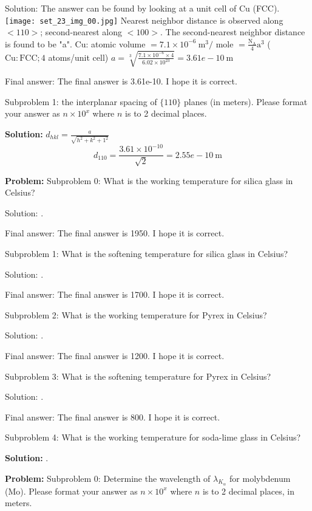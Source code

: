 \documentclass[10pt]{article}
\begin{document}
Solution: The answer can be found by looking at a unit cell of $\mathrm{Cu}$ (FCC).
\texttt{[image: set\_23\_img\_00.jpg]}
\nonessentialimage
Nearest neighbor distance is observed along $<110>$; second-nearest along $<100>$. The second-nearest neighbor distance is found to be "a".
Cu: atomic volume $=7.1 \times 10^{-6} \mathrm{~m}^{3} /$ mole $=\frac{\mathrm{N}_{\mathrm{A}}}{4} \mathrm{a}^{3}$ ( $\mathrm{Cu}: \mathrm{FCC} ; 4$ atoms/unit cell) $a=\sqrt[3]{\frac{7.1 \times 10^{-6} \times 4}{6.02 \times 10^{23}}}= \boxed{3.61e-10} \mathrm{~m}$

Final answer: The final answer is 3.61e-10. I hope it is correct.

Subproblem 1: the interplanar spacing of $\{110\}$ planes (in meters). Please format your answer as $n \times 10^x$ where $n$ is to 2 decimal places.


\textbf{Solution:}
$d_{h k l}=\frac{a}{\sqrt{h^{2}+k^{2}+1^{2}}}$
\[
d_{110}=\frac{3.61 \times 10^{-10}}{\sqrt{2}}= \boxed{2.55e-10} \mathrm{~m}
\]


\textbf{Problem:}
Subproblem 0: What is the working temperature for silica glass in Celsius?


Solution: .

Final answer: The final answer is 1950. I hope it is correct.

Subproblem 1: What is the softening temperature for silica glass in Celsius?


Solution: .

Final answer: The final answer is 1700. I hope it is correct.

Subproblem 2: What is the working temperature for Pyrex in Celsius?


Solution: .

Final answer: The final answer is 1200. I hope it is correct.

Subproblem 3: What is the softening temperature for Pyrex in Celsius?


Solution: .

Final answer: The final answer is 800. I hope it is correct.

Subproblem 4: What is the working temperature for soda-lime glass in Celsius?


\textbf{Solution:}
.


\textbf{Problem:}
Subproblem 0: Determine the wavelength of $\lambda_{K_{\alpha}}$ for molybdenum (Mo). Please format your answer as $n \times 10^x$ where $n$ is to 2 decimal places, in meters.
\end{document}

